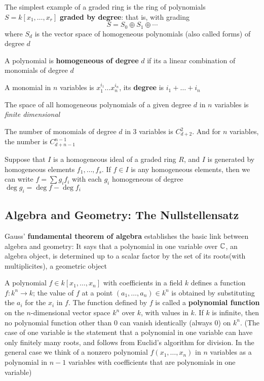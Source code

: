 \documentclass[11pt]{article}
\begin{document}
The simplest example of a graded ring is the ring of polynomials
\(S=k[x_1,\dots,x_r]\) \textbf{graded by degree}: that is, with grading
\begin{equation*}
S=S_0\oplus S_1\oplus\cdots
\end{equation*}
where \(S_d\) is the vector space of homogeneous polynomials (also called
forms) of degree \(d\)

\begin{definition}[]
A polynomial is \textbf{homogeneous of degree} \(d\) if its a linear combination of
monomials of degree \(d\)

A monomial in \(n\) variables is \(x_1^{i_1}\dots x_n^{i_n}\), its \textbf{degree} is \(i_1+\dots+i_n\)
\end{definition}

The space of all homogeneous polynomials of a given degree \(d\) in \(n\)
variables is \emph{finite dimensional}

\begin{proposition}[]
The number of monomials of degree \(d\) in 3 variables is \(C_{d+2}^2\). And
for \(n\) variables, the number is \(C_{d+n-1}^{n-1}\)
\end{proposition}

Suppose that \(I\) is a homogeneous ideal of a graded ring \(R\), and \(I\)
is generated by homogeneous elements \(f_1,\dots,f_s\). If \(f\in I\) is any
homogeneous elements, then we can write \(f=\sum g_if_i\) with each \(g_i\)
homogeneous of degree \(\deg g_i=\deg f-\deg f_i\)
\subsection{Algebra and Geometry: The Nullstellensatz}
\label{sec:org6418361}
Gauss' \textbf{fundamental theorem of algebra} establishes the basic link between
algebra and geometry: It says that a polynomial in one variable over \(\mathbb{C}\),
an algebra object, is determined up to a scalar factor by the set of its
roots(with multiplicites), a geometric object

A polynomial \(f\in k[x_1,\dots,x_n]\) with coefficients in a field \(k\)
defines a function \(f:k^n\to k\); the value of \(f\) at a point
\((a_1,\dots,a_n)\in k^n\) is obtained by substituting the \(a_i\) for the
\(x_i\) in \(f\). The function defined by \(f\) is called a \textbf{polynomial
function} on the \(n\)-dimensional vector space \(k^n\) over \(k\), with
values in \(k\). If \(k\) is infinite, then no polynomial function other than
0 can vanish identically (always 0) on \(k^n\). (The case of one variable is
the statement that a polynomial in one variable can have only finitely many
roots, and follows from Euclid's algorithm for division. In the general case
we think of a nonzero polynomial \(f(x_1,\dots,x_n)\) in \(n\) variables as a
polynomial in \(n-1\) variables with coefficients that are polynomials in one
variable)
\end{document}
